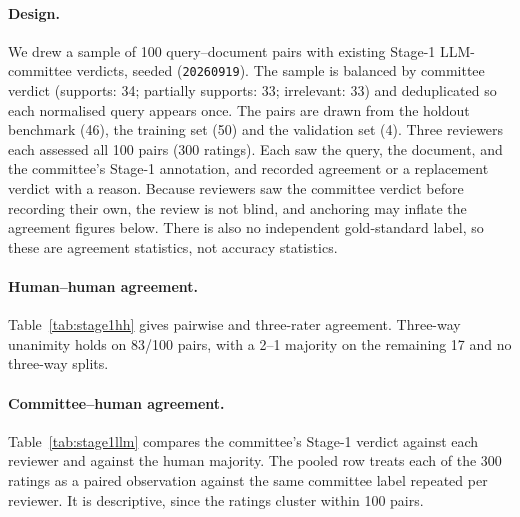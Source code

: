 \paragraph{Design.} We drew a sample of 100 query--document pairs with
existing Stage-1 LLM-committee verdicts, seeded (\texttt{20260919}). The sample is balanced
by committee verdict (supports: 34; partially supports: 33; irrelevant: 33)
and deduplicated so each normalised query appears once. The pairs are drawn
from the holdout benchmark (46), the training set (50) and the validation
set (4). Three reviewers each assessed all 100 pairs (300 ratings). Each saw
the query, the document, and the committee's Stage-1 annotation, and recorded
agreement or a replacement verdict with a reason. Because reviewers saw the
committee verdict before recording their own, the review is not blind, and
anchoring may inflate the agreement figures below. There is also no
independent gold-standard label, so these are agreement statistics, not
accuracy statistics.

\paragraph{Human--human agreement.} Table~\ref{tab:stage1hh} gives pairwise
and three-rater agreement. Three-way unanimity holds on 83/100 pairs, with a
2--1 majority on the remaining 17 and no three-way splits.

\begin{table}[htbp]\centering

\caption{\textbf{Stage-1 review: human--human agreement} across the three reviewers, 100 pairs (300 ratings). ``---'' marks a cell the statistic does not apply to.}
\label{tab:stage1hh}
\end{table}

\paragraph{Committee--human agreement.} Table~\ref{tab:stage1llm} compares the
committee's Stage-1 verdict against each reviewer and against the human
majority. The pooled row treats each of the 300 ratings as a paired
observation against the same committee label repeated per reviewer. It is
descriptive, since the ratings cluster within 100 pairs.

\begin{table}[htbp]\centering

\caption{\textbf{Stage-1 review: committee--human agreement.} \textsuperscript{*}Pooled statistic. The 300 ratings share 100 underlying pairs.}
\label{tab:stage1llm}
\end{table}

